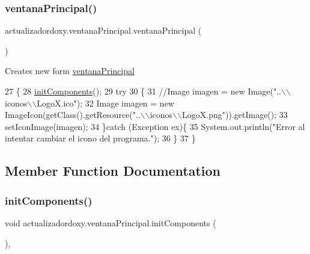 \subsubsection{\texorpdfstring{ventana\+Principal()}{ventanaPrincipal()}}
{\footnotesize\ttfamily actualizadordoxy.\+ventana\+Principal.\+ventana\+Principal (\begin{DoxyParamCaption}{ }\end{DoxyParamCaption})\hspace{0.3cm}{\ttfamily [inline]}}

Creates new form \mbox{\hyperlink{classactualizadordoxy_1_1ventana_principal}{ventana\+Principal}} 
\begin{DoxyCode}
27                               \{
28         \mbox{\hyperlink{classactualizadordoxy_1_1ventana_principal_af0eb6bf60de2f8adbaac5a458428e2fe}{initComponents}}();
29         \textcolor{keywordflow}{try}
30         \{
31             \textcolor{comment}{//Image imagen = new Image("..\(\backslash\)\(\backslash\)iconos\(\backslash\)\(\backslash\)LogoX.ico");}
32             Image imagen = \textcolor{keyword}{new} ImageIcon(getClass().getResource(\textcolor{stringliteral}{"..\(\backslash\)\(\backslash\)iconos\(\backslash\)\(\backslash\)LogoX.png"})).getImage();
33             setIconImage(imagen);
34         \}\textcolor{keywordflow}{catch} (Exception ex)\{
35             System.out.println(\textcolor{stringliteral}{"Error al intentar cambiar el icono del programa."});
36         \}
37     \}
\end{DoxyCode}


\subsection{Member Function Documentation}
\mbox{\label{classactualizadordoxy_1_1ventana_principal_af0eb6bf60de2f8adbaac5a458428e2fe}} 
\subsubsection{\texorpdfstring{init\+Components()}{initComponents()}}
{\footnotesize\ttfamily void actualizadordoxy.\+ventana\+Principal.\+init\+Components (\begin{DoxyParamCaption}{ }\end{DoxyParamCaption})\hspace{0.3cm}{\ttfamily [inline]}, {\ttfamily [private]}}

